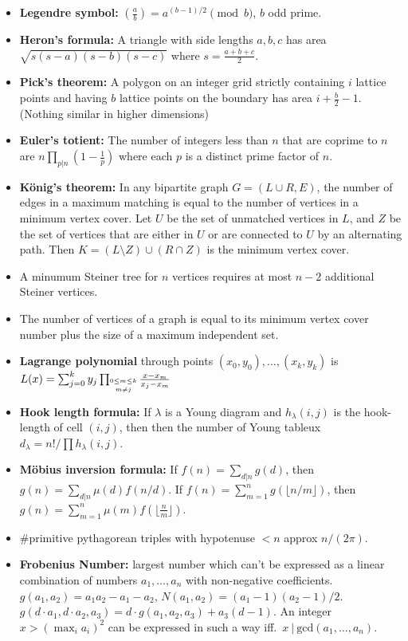     \begin{itemize}[leftmargin=*]
      \item \textbf{Legendre symbol:} $\left(\frac{a}{b}\right) = a^{(b-1)/2} \pmod{b}$, $b$ odd prime.
      \item \textbf{Heron's formula:} A triangle with side lengths
        $a,b,c$ has area $\sqrt{s(s-a)(s-b)(s-c)}$ where $s =
        \frac{a+b+c}{2}$.
      \item \textbf{Pick's theorem:} A polygon on an integer grid
        strictly containing $i$ lattice points and having $b$ lattice
        points on the boundary has area $i + \frac{b}{2} - 1$. (Nothing
        similar in higher dimensions)
      \item \textbf{Euler's totient:} The number of integers less than
        $n$ that are coprime to $n$ are $n\prod_{p|n}\left(1 - \frac{1}{p}\right)$
        where each $p$ is a distinct prime factor of $n$.
      \item \textbf{König's theorem:} In any bipartite graph $G=(L\cup R,E)$, the number
        of edges in a maximum matching is equal to the number of
        vertices in a minimum vertex cover. Let $U$ be the set of
        unmatched vertices in $L$, and $Z$ be the set of vertices that
        are either in $U$ or are connected to $U$ by an alternating
        path. Then $K=(L\setminus Z)\cup(R\cap Z)$ is the minimum
        vertex cover.
      \item A minumum Steiner tree for $n$ vertices requires at most $n-2$ additional Steiner vertices.
      \item The number of vertices of a graph is equal to its minimum
        vertex cover number plus the size of a maximum independent set.
      \item \textbf{Lagrange polynomial} through points $(x_0,y_0),\ldots,(x_k,y_k)$ is $L(x) = \sum_{j=0}^k y_j \prod_{\shortstack{$\scriptscriptstyle 0\leq m \leq k$ \\ $\scriptscriptstyle m\neq j$}} \frac{x-x_m}{x_j - x_m}$
      \item \textbf{Hook length formula:} If $\lambda$ is a Young diagram and $h_{\lambda}(i,j)$ is the hook-length of cell $(i,j)$, then then the number of Young tableux $d_{\lambda} = n!/\prod h_{\lambda}(i,j)$.
      \item \textbf{Möbius inversion formula:} If $f(n) = \sum_{d|n} g(d)$, then $g(n) = \sum_{d|n} \mu(d) f(n/d)$. If $f(n) = \sum_{m=1}^n g(\lfloor n/m\rfloor)$, then $g(n) = \sum_{m=1}^n \mu(m)f(\lfloor\frac{n}{m}\rfloor)$.
      \item \#primitive pythagorean triples with hypotenuse $<n$ approx $n/(2\pi)$.
      \item \textbf{Frobenius Number:} largest number which can't be
        expressed as a linear combination of numbers $a_1,\ldots,a_n$
        with non-negative coefficients. $g(a_1,a_2) = a_1a_2-a_1-a_2$,
        $N(a_1,a_2)=(a_1-1)(a_2-1)/2$. $g(d\cdot a_1,d\cdot a_2,a_3) =
        d\cdot g(a_1,a_2,a_3) + a_3(d-1)$. An integer $x>\left(\max_i
        a_i\right)^2$ can be expressed in such a way iff.\ $x\ |\
        \mathrm{gcd}(a_1,\ldots,a_n)$.
    \end{itemize}

